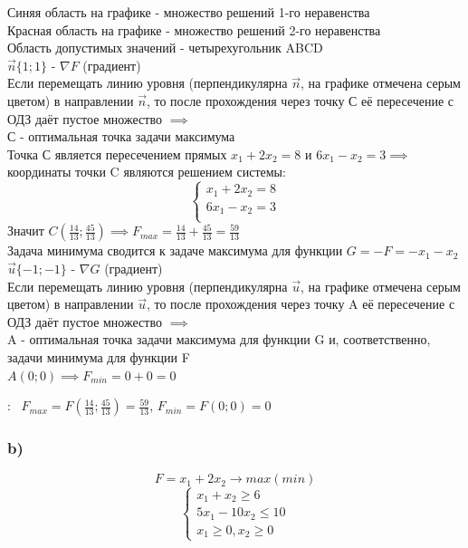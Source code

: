 \begin{flushleft}
    Синяя область на графике - множество решений 1-го неравенства\\
    Красная область на графике - множество решений 2-го неравенства\\
    Область допустимых значений - четырехугольник ABCD\\
    $\vec{n}\{1; 1\}$ - $\nabla F$ (градиент)\\
    Если перемещать линию уровня (перпендикулярна $\vec{n}$, на графике отмечена серым цветом) в направлении $\vec{n}$, то после прохождения через точку С её пересечение с ОДЗ даёт пустое множество $\implies$ \\С - оптимальная точка задачи максимума\\
    Точка С является пересечением прямых $x_1 + 2x_2 = 8$ и $6x_1 - x_2 = 3 \implies$ координаты точки C являются решением системы:\\
    \begin{equation*}
        \begin{cases}
            x_1 + 2x_2 = 8 \\
            6x_1 - x_2 = 3 \\
        \end{cases}
    \end{equation*}
    Значит $C(\frac{14}{13}; \frac{45}{13}) \implies F_{max} = \frac{14}{13} + \frac{45}{13} = \frac{59}{13}$ \\
    Задача минимума сводится к задаче максимума для функции $G = -F = -x_1 - x_2$ \\
    $\vec{u}\{-1; -1\}$ - $\nabla G$ (градиент)\\
    Если перемещать линию уровня (перпендикулярна $\vec{u}$, на графике отмечена серым цветом) в направлении $\vec{u}$, то после прохождения через точку A её пересечение с ОДЗ даёт пустое множество $\implies$ \\A - оптимальная точка задачи максимума для функции G и, соответственно, задачи минимума для функции F\\
    $A(0; 0) \implies F_{min} = 0 + 0 = 0$
\end{flushleft}

{:~} $F_{max} = F(\frac{14}{13}; \frac{45}{13}) = \frac{59}{13}$,  $F_{min} = F(0; 0) = 0$ 

\subsubsection{b)}
\begin{equation*}
    F = x_1 + 2x_2 \rightarrow max(min)
\end{equation*}
\begin{equation*}
    \begin{cases}
        x_1 + x_2 \ge 6 \\
        5x_1 - 10x_2 \le 10 \\
        x_1 \ge 0, x_2 \ge 0
    \end{cases}
\end{equation*}

